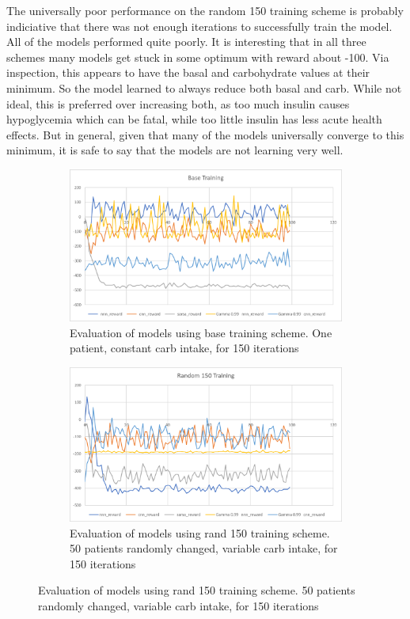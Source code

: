 \documentclass[11pt]{article}
\begin{document}
The universally poor performance on the random 150 training scheme is probably indiciative that there was not enough iterations to successfully train the model.
All of the models performed quite poorly. 
It is interesting that in all three schemes many models get stuck in some optimum with reward about -100.
Via inspection, this appears to have the basal and carbohydrate values at their minimum.
So the model learned to always reduce both basal and carb. 
While not ideal, this is preferred over increasing both, as too much insulin causes hypoglycemia which can be fatal,
while too little insulin has less acute health effects.
But in general, given that many of the models universally converge to this minimum, 
it is safe to say that the models are not learning very well.

\begin{figure}
    \centering

    \begin{subfigure}{0.62 \textwidth}
        \centering
        \includegraphics[width=\textwidth]{base.png}
        \caption{Evaluation of models using base training scheme. One patient, constant carb intake, for 150 iterations}
        \label{fig:base}
    \end{subfigure}
    
    \begin{subfigure}{0.62 \textwidth}
        \centering
        \includegraphics[width=\textwidth]{rand150.png}
        \caption{Evaluation of models using rand 150 training scheme. 50 patients randomly changed, variable carb intake, for 150 iterations}
        \label{fig:rand150}
    \end{subfigure}
    

\end{figure}
\end{document}
